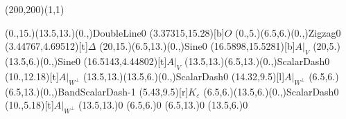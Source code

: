 \unitlength=1bp%

\begin{feynartspicture}(200,200)(1,1)

\FADiagram{}
\FAProp(0.,15.)(13.5,13.)(0.,){DoubleLine}{0}
\FALabel(3.37315,15.28)[b]{$O$}
\FAProp(0.,5.)(6.5,6.)(0.,){Zigzag}{0}
\FALabel(3.44767,4.69512)[t]{$\Delta$}
\FAProp(20,15.)(6.5,13.)(0.,){Sine}{0}
\FALabel(16.5898,15.5281)[b]{$A|_V$}
\FAProp(20,5.)(13.5,6.)(0.,){Sine}{0}
\FALabel(16.5143,4.44802)[t]{$A|_V$}
\FAProp(13.5,13.)(6.5,13.)(0.,){ScalarDash}{0}
\FALabel(10.,12.18)[t]{$A|_{W^\perp}$}
\FAProp(13.5,13.)(13.5,6.)(0.,){ScalarDash}{0}
\FALabel(14.32,9.5)[l]{$A|_{W^\perp}$}
\FAProp(6.5,6.)(6.5,13.)(0.,){BandScalarDash}{-1}
\FALabel(5.43,9.5)[r]{$K_\varepsilon$}
\FAProp(6.5,6.)(13.5,6.)(0.,){ScalarDash}{0}
\FALabel(10.,5.18)[t]{$A|_{W^\perp}$}
\FAVert(13.5,13.){0}
\FAVert(6.5,6.){0}
\FAVert(6.5,13.){0}
\FAVert(13.5,6.){0}
\end{feynartspicture}

